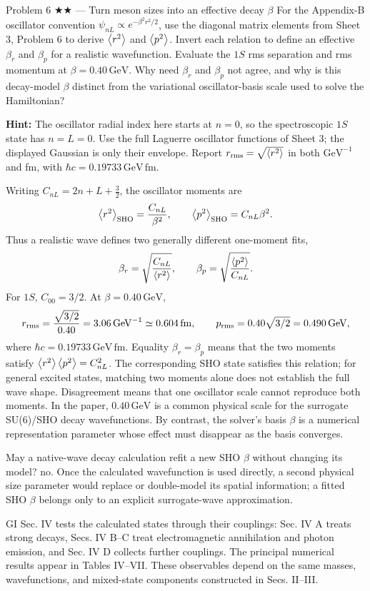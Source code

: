 \documentclass[11pt]{article}
\begin{document}
\begin{problem}{Problem 6 ★★ — Turn meson sizes into an effective decay $\beta$}
For the Appendix-B oscillator convention
$\psi_{nL}\propto e^{-\beta^2r^2/2}$, use the diagonal matrix elements from
Sheet 3, Problem 6 to derive $\left\langle r^2\right\rangle$ and $\left\langle p^2\right\rangle$. Invert each
relation to define an effective $\beta_r$ and $\beta_p$ for a realistic
wavefunction. Evaluate the $1S$ rms separation and rms momentum at
$\beta=0.40\,\mathrm{GeV}$. Why need $\beta_r$ and $\beta_p$ not agree, and why
is this decay-model $\beta$ distinct from the variational oscillator-basis
scale used to solve the Hamiltonian?

\textbf{Hint:} The oscillator radial index here starts at $n=0$, so the
spectroscopic $1S$ state has $n=L=0$. Use the full Laguerre oscillator
functions of Sheet 3; the displayed Gaussian is only their envelope.
Report $r_{\rm rms}=\sqrt{\left\langle r^2\right\rangle}$ in both $\mathrm{GeV}^{-1}$ and
fm, with $\hbar c=0.19733\,\mathrm{GeV\,fm}$.
\end{problem}
\begin{solution}
Writing $C_{nL}=2n+L+\tfrac32$, the oscillator moments are
\[
 \left\langle r^2\right\rangle_{\rm SHO}=\frac{C_{nL}}{\beta^2},\qquad
 \left\langle p^2\right\rangle_{\rm SHO}=C_{nL}\beta^2 .
\]
Thus a realistic wave defines two generally different one-moment fits,
\[
 \beta_r=\sqrt{\frac{C_{nL}}{\left\langle r^2\right\rangle}},\qquad
 \beta_p=\sqrt{\frac{\left\langle p^2\right\rangle}{C_{nL}}}.
\]
For $1S$, $C_{00}=3/2$. At $\beta=0.40\,\mathrm{GeV}$,
\[
 r_{\rm rms}=\frac{\sqrt{3/2}}{0.40}=3.06\,\mathrm{GeV}^{-1}
              \simeq0.604\,\mathrm{fm},\qquad
 p_{\rm rms}=0.40\sqrt{3/2}=0.490\,\mathrm{GeV},
\]
where $\hbar c=0.19733\,\mathrm{GeV\,fm}$. Equality $\beta_r=\beta_p$ means that the two moments satisfy
$\left\langle r^2\right\rangle\left\langle p^2\right\rangle=C_{nL}^2$. The corresponding SHO state satisfies
this relation; for general excited states, matching two moments alone does not
establish the full wave shape. Disagreement means that one oscillator scale
cannot reproduce both moments. In the paper, $0.40\,\mathrm{GeV}$ is a common physical scale for the
surrogate SU(6)/SHO decay wavefunctions. By contrast, the solver's basis
$\beta$ is a numerical representation parameter whose effect must disappear
as the basis converges.
\end{solution}
\begin{quiz}
May a native-wave decay calculation refit a new SHO $\beta$ without changing
its model? \answer no. Once the calculated wavefunction is used directly, a
second physical size parameter would replace or double-model its spatial
information; a fitted SHO $\beta$ belongs only to an explicit surrogate-wave
approximation.
\end{quiz}

\begin{paperbridge}
GI Sec. IV tests the calculated states through their couplings: Sec. IV A treats
strong decays, Secs. IV B--C treat electromagnetic annihilation and photon
emission, and Sec. IV D collects further couplings. The principal numerical
results appear in Tables IV--VII. These observables depend on the same masses,
wavefunctions, and mixed-state components constructed in Secs. II--III.
\end{paperbridge}
\end{document}
